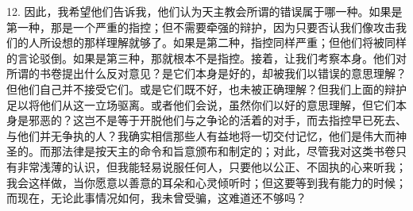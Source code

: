 12. 因此，我希望他们告诉我，他们认为天主教会所谓的错误属于哪一种。如果是第一种，那是一个严重的指控；但不需要牵强的辩护，因为只要否认我们像攻击我们的人所设想的那样理解就够了。如果是第二种，指控同样严重；但他们将被同样的言论驳倒。如果是第三种，那就根本不是指控。接着，让我们考察本身。他们对所谓的书卷提出什么反对意见？是它们本身是好的，却被我们以错误的意思理解？但他们自己并不接受它们。或是它们既不好，也未被正确理解？但我们上面的辩护足以将他们从这一立场驱离。或者他们会说，虽然你们以好的意思理解，但它们本身是邪恶的？这岂不是等于开脱他们与之争论的活着的对手，而去指控早已死去、与他们并无争执的人？我确实相信那些人有益地将一切交付记忆，他们是伟大而神圣的。而那法律是按天主的命令和旨意颁布和制定的；对此，尽管我对这类书卷只有非常浅薄的认识，但我能轻易说服任何人，只要他以公正、不固执的心来听我；我会这样做，当你愿意以善意的耳朵和心灵倾听时；但这要等到我有能力的时候；而现在，无论此事情况如何，我未曾受骗，这难道还不够吗？\par

